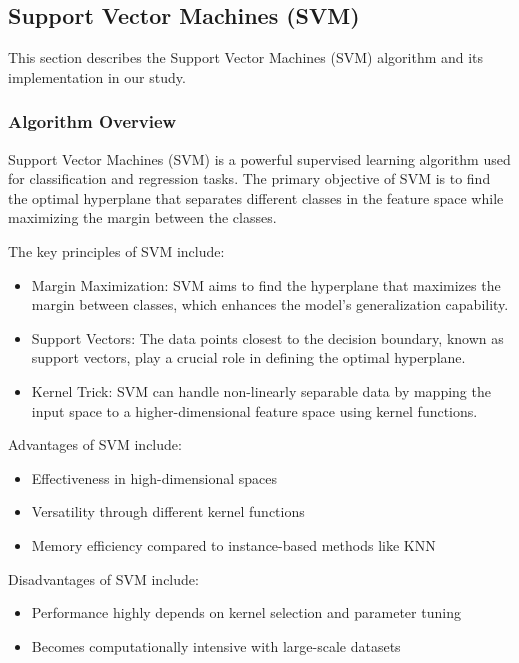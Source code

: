 \subsection{Support Vector Machines (SVM)}
\label{subsec:methods-svm}

This section describes the Support Vector Machines (SVM) algorithm and its implementation in our study.

\subsubsection{Algorithm Overview}

Support Vector Machines (SVM) is a powerful supervised learning algorithm used for classification and
regression tasks. The primary objective of SVM is to find the optimal hyperplane that separates different classes
in the feature space while maximizing the margin between the classes\cite{burges1998svmTutorial}.

The key principles of SVM include:
\begin{itemize}
    \item Margin Maximization: SVM aims to find the hyperplane that maximizes the margin between classes, which enhances the model's generalization capability.
    \item Support Vectors: The data points closest to the decision boundary, known as support vectors, play a crucial role in defining the optimal hyperplane.
    \item Kernel Trick: SVM can handle non-linearly separable data by mapping the input space to a higher-dimensional feature space using kernel functions.
\end{itemize}

Advantages of SVM include:
\begin{itemize}
    \item Effectiveness in high-dimensional spaces
    \item Versatility through different kernel functions
    \item Memory efficiency compared to instance-based methods like KNN
\end{itemize}

Disadvantages of SVM include:
\begin{itemize}
    \item Performance highly depends on kernel selection and parameter tuning
    \item Becomes computationally intensive with large-scale datasets
\end{itemize}

